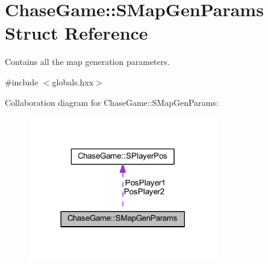 \hypertarget{struct_chase_game_1_1_s_map_gen_params}{\section{Chase\-Game\-:\-:S\-Map\-Gen\-Params Struct Reference}
\label{struct_chase_game_1_1_s_map_gen_params}
}


Contains all the map generation parameters.  




{\ttfamily \#include $<$globals.\-hxx$>$}



Collaboration diagram for Chase\-Game\-:\-:S\-Map\-Gen\-Params\-:
\nopagebreak
\begin{figure}[H]
\begin{center}
\leavevmode
\includegraphics[width=234pt]{struct_chase_game_1_1_s_map_gen_params__coll__graph}
\end{center}
\end{figure}
